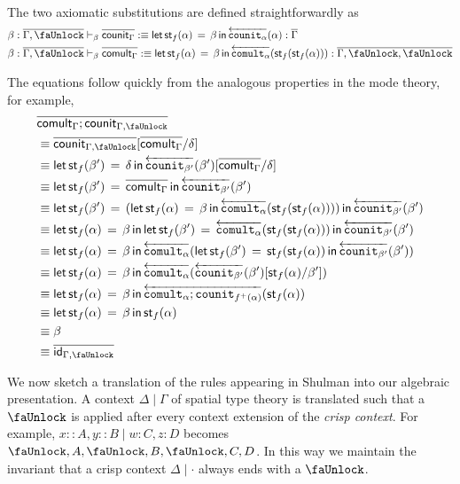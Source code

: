 \documentclass[10pt]{article}
\theoremstyle{definition}
\newcommand{\yields}{\vdash}
\newcommand{\id}{\mathsf{id}}
\newcommand{\rewrite}[2]{\overleftarrow{#1}(#2)}
\newcommand\StI[2]{\ensuremath{\mathsf{st}_{#1}(#2)}}
\newcommand\StE[4]{\ensuremath{\mathsf{let} \, \StI{#1}{#3} \, = \, {#2} \, \mathsf{in} \, #4}}
\newcommand\TrPlus[2]{\ensuremath{{#1}^+(#2)}}
\newcommand{\upstairs}[1]{\overline{#1}}
\newcommand{\lock}{\text{\faUnlock}}
\newcommand\fcomult[1]{\ensuremath{\mathtt{comult}_{#1}}}
\newcommand\fcounit[1]{\ensuremath{\mathtt{counit}_{#1}}}
\newcommand{\counit}[1]{\mathsf{counit}_{#1}}
\newcommand{\comult}[1]{\mathsf{comult}_{#1}}
\begin{document}
The two axiomatic substitutions are defined straightforwardly as
\begin{align*}
\beta : \upstairs{\Gamma, \lock} &\yields_\beta \upstairs{\counit{\Gamma}} :\equiv \StE{f}{\beta}{\alpha}{\rewrite{\fcounit{\alpha}}{\alpha}} : \upstairs{\Gamma} \\
\beta : \upstairs{\Gamma, \lock} &\yields_\beta \upstairs{\comult{\Gamma}} :\equiv \StE{f}{\beta}{\alpha}{\rewrite{\fcomult{\alpha}}{\StI{f}{\StI{f}{\alpha}}}} : \upstairs{\Gamma, \lock, \lock}
\end{align*}

The equations follow quickly from the analogous properties in the mode theory, for example, 
\begin{align*}
&\upstairs{\comult{\Gamma} ; \counit{\Gamma, \lock}} \\
&\equiv \upstairs{\counit{\Gamma, \lock}}[\upstairs{\comult{\Gamma}}/\delta] \\ 
&\equiv \StE{f}{\delta}{\beta'}{\rewrite{\fcounit{\beta'}}{\beta'}}[\upstairs{\comult{\Gamma}}/\delta] \\ 
&\equiv \StE{f}{\upstairs{\comult{\Gamma}}}{\beta'}{\rewrite{\fcounit{\beta'}}{\beta'}} \\ 
&\equiv \StE{f}{(\StE{f}{\beta}{\alpha}{\rewrite{\fcomult{\alpha}}{\StI{f}{\StI{f}{\alpha}}}})}{\beta'}{\rewrite{\fcounit{\beta'}}{\beta'}} \\
&\equiv \StE{f}{\beta}{\alpha}{\StE{f}{\rewrite{\fcomult{\alpha}}{\StI{f}{\StI{f}{\alpha}}}}{\beta'}{\rewrite{\fcounit{\beta'}}{\beta'}}} \\
&\equiv \StE{f}{\beta}{\alpha}{\rewrite{\fcomult{\alpha}}{\StE{f}{\StI{f}{\StI{f}{\alpha}}}{\beta'}{\rewrite{\fcounit{\beta'}}{\beta'}}}} \\
&\equiv \StE{f}{\beta}{\alpha}{\rewrite{\fcomult{\alpha}}{\rewrite{\fcounit{\beta'}}{\beta'}[\StI{f}{\alpha}/\beta']}} \\
&\equiv \StE{f}{\beta}{\alpha}{\rewrite{\fcomult{\alpha};\fcounit{\TrPlus{f}{\alpha}}}{\StI{f}{\alpha}}} \\
&\equiv \StE{f}{\beta}{\alpha}{\StI{f}{\alpha}} \\
&\equiv \beta \\
&\equiv \upstairs{\id_{\Gamma, \lock}}
\end{align*}

We now sketch a translation of the rules appearing in Shulman  into our algebraic presentation. A context $\Delta \mid \Gamma$ of spatial type theory is translated such that a $\lock$ is applied after every context extension of the \emph{crisp context}. For example, $x :: A, y :: B \mid w : C, z : D$ becomes $\lock, A, \lock, B, \lock, C, D$. In this way we maintain the invariant that a crisp context $\Delta \mid \cdot$ always ends with a $\lock$. 
\end{document}
